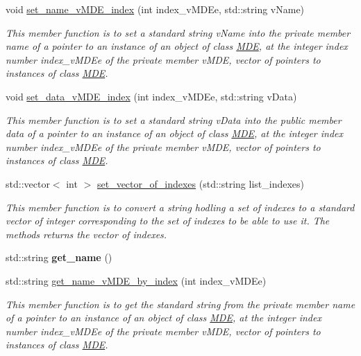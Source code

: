 \begin{DoxyCompactItemize}
void \hyperlink{group__group__set_gaa140f8ec04b385dad147e8d4defc8434}{set\+\_\+name\+\_\+v\+M\+D\+E\+\_\+index} (int index\+\_\+v\+M\+D\+Ee, std\+::string v\+Name)
\begin{DoxyCompactList}\small\item\em This member function is to set a standard string v\+Name into the private member \textquotesingle{}name\textquotesingle{} of a pointer to an instance of an object of class \hyperlink{classMDE}{M\+DE}, at the integer index number index\+\_\+v\+M\+D\+Ee of the private member v\+M\+DE, vector of pointers to instances of class \hyperlink{classMDE}{M\+DE}. \end{DoxyCompactList}\item 
void \hyperlink{group__group__set_ga5dee98068559783970fd355f7183add7}{set\+\_\+data\+\_\+v\+M\+D\+E\+\_\+index} (int index\+\_\+v\+M\+D\+Ee, std\+::string v\+Data)
\begin{DoxyCompactList}\small\item\em This member function is to set a standard string v\+Data into the public member \textquotesingle{}data\textquotesingle{} of a pointer to an instance of an object of class \hyperlink{classMDE}{M\+DE}, at the integer index number index\+\_\+v\+M\+D\+Ee of the private member v\+M\+DE, vector of pointers to instances of class \hyperlink{classMDE}{M\+DE}. \end{DoxyCompactList}\item 
std\+::vector$<$ int $>$ \hyperlink{group__group__set_ga509b0f655b4883bbf55b97bf71bf177b}{set\+\_\+vector\+\_\+of\+\_\+indexes} (std\+::string list\+\_\+indexes)
\begin{DoxyCompactList}\small\item\em This member function is to convert a string hodling a set of indexes to a standard vector of integer corresponding to the set of indexes to be able to use it. The methods returns the vector of indexes. \end{DoxyCompactList}\item 
std\+::string {\bfseries get\+\_\+name} ()
\item 
std\+::string \hyperlink{group__group__get_ga8bb6595c805411ef0c044763a1a3310a}{get\+\_\+name\+\_\+v\+M\+D\+E\+\_\+by\+\_\+index} (int index\+\_\+v\+M\+D\+Ee)
\begin{DoxyCompactList}\small\item\em This member function is to get the standard string from the private member \textquotesingle{}name\textquotesingle{} of a pointer to an instance of an object of class \hyperlink{classMDE}{M\+DE}, at the integer index number index\+\_\+v\+M\+D\+Ee of the private member v\+M\+DE, vector of pointers to instances of class \hyperlink{classMDE}{M\+DE}. \end{DoxyCompactList}\item 

\end{DoxyCompactItemize}

